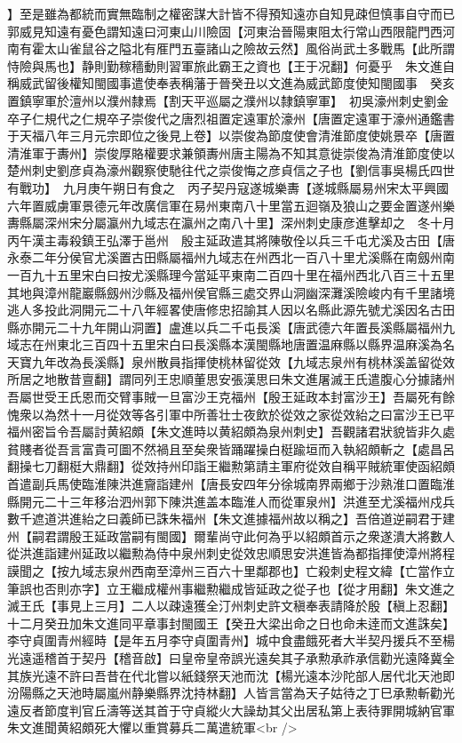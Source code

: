 】至是雖為都統而實無臨制之權密謀大計皆不得預知遠亦自知見疎但慎事自守而已郭威見知遠有憂色謂知遠曰河東山川險固【河東治晉陽東阻太行常山西限龍門西河南有霍太山雀鼠谷之隘北有㕍門五臺諸山之險故云然】風俗尚武土多戰馬【此所謂恃險與馬也】静則勤稼穡動則習軍旅此霸王之資也【王于况翻】何憂乎　朱文進自稱威武留後權知閩國事遣使奉表稱藩于晉癸丑以文進為威武節度使知閩國事　癸亥置鎮寧軍於澶州以濮州隸焉【割天平巡屬之濮州以隸鎮寧軍】　初吳濠州刺史劉金卒子仁規代之仁規卒子崇俊代之唐烈祖置定遠軍於濠州【唐置定遠軍于濠州通鑑書于天福八年三月元宗即位之後見上卷】以崇俊為節度使會清淮節度使姚景卒【唐置清淮軍于夀州】崇俊厚賂權要求兼領夀州唐主陽為不知其意徙崇俊為清淮節度使以楚州刺史劉彦貞為濠州觀察使馳往代之崇俊悔之彦貞信之子也【劉信事吳楊氏四世有戰功】　九月庚午朔日有食之　丙子契丹寇遂城樂夀【遂城縣屬易州宋太平興國六年置威虜軍景德元年改廣信軍在易州東南八十里當五迴嶺及狼山之要金置遂州樂夀縣屬深州宋分屬瀛州九域志在瀛州之南八十里】深州刺史康彦進擊却之　冬十月丙午漢主毒殺鎮王弘澤于邕州　殷主延政遣其將陳敬佺以兵三千屯尤溪及古田【唐永泰二年分侯官尤溪置古田縣屬福州九域志在州西北一百八十里尤溪縣在南劔州南一百九十五里宋白曰按尤溪縣理今當延平東南二百四十里在福州西北八百三十五里其地與漳州龍巖縣劔州沙縣及福州侯官縣三處交界山洞幽深灘溪險峻内有千里諸境逃人多投此洞開元二十八年經畧使唐修忠招諭其人因以名縣此源先號尤溪因名古田縣亦開元二十九年開山洞置】盧進以兵二千屯長溪【唐武德六年置長溪縣屬福州九域志在州東北三百四十五里宋白曰長溪縣本漢閩縣地唐置温麻縣以縣界温麻溪為名天寶九年改為長溪縣】泉州散員指揮使桃林留從效【九域志泉州有桃林溪盖留從效所居之地散昔亶翻】謂同列王忠順董思安張漢思曰朱文進屠滅王氏遣腹心分據諸州吾屬世受王氏恩而交臂事賊一旦富沙王克福州【殷王延政本封富沙王】吾屬死有餘愧衆以為然十一月從效等各引軍中所善壮士夜飲於從效之家從效紿之曰富沙王已平福州密旨令吾屬討黄紹頗【朱文進時以黄紹頗為泉州刺史】吾觀諸君狀貌皆非久處貧賤者從吾言富貴可圖不然禍且至矣衆皆踊躍操白梃踰垣而入執紹頗斬之【處昌呂翻操七刀翻梃大鼎翻】從效持州印詣王繼勲第請主軍府從效自稱平賊統軍使函紹頗首遣副兵馬使臨淮陳洪進齎詣建州【唐長安四年分徐城南界兩鄉于沙熟淮口置臨淮縣開元二十三年移治泗州郭下陳洪進盖本臨淮人而從軍泉州】洪進至尤溪福州戍兵數千遮道洪進紿之曰義師已誅朱福州【朱文進據福州故以稱之】吾倍道逆嗣君于建州【嗣君謂殷王延政當嗣有閩國】爾輩尚守此何為乎以紹頗首示之衆遂潰大將數人從洪進詣建州延政以繼勲為侍中泉州刺史從效忠順思安洪進皆為都指揮使漳州將程謨聞之【按九域志泉州西南至漳州三百六十里鄰郡也】亡殺刺史程文緯【亡當作立筆誤也否則亦字】立王繼成權州事繼勲繼成皆延政之從子也【從才用翻】朱文進之滅王氏【事見上三月】二人以疎遠獲全汀州刺史許文稹奉表請降於殷【稹上忍翻】　十二月癸丑加朱文進同平章事封閩國王【癸丑大梁出命之日也命未逹而文進誅矣】　李守貞圍青州經時【是年五月李守貞圍青州】城中食盡餓死者大半契丹援兵不至楊光遠遥稽首于契丹【稽音啟】曰皇帝皇帝誤光遠矣其子承勲承祚承信勸光遠降冀全其族光遠不許曰吾昔在代北嘗以紙錢祭天池而沈【楊光遠本沙陀部人居代北天池即汾陽縣之天池時屬嵐州静樂縣界沈持林翻】人皆言當為天子姑待之丁巳承勲斬勸光遠反者節度判官丘濤等送其首于守貞縱火大譟劫其父出居私第上表待罪開城納官軍朱文進聞黄紹頗死大懼以重賞募兵二萬遣統軍<br />
